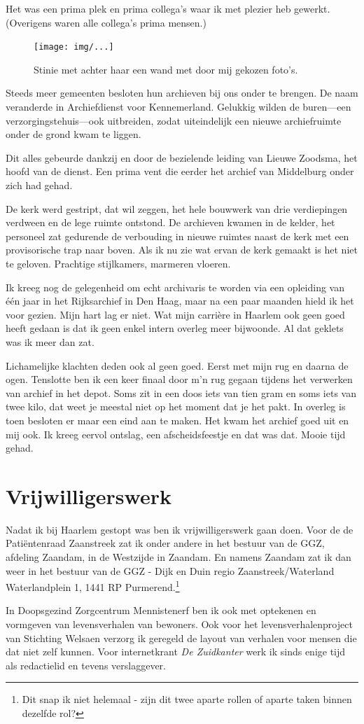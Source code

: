 \documentclass[12pt,twoside]{memoir}
\begin{document}
Het was een prima plek en prima collega’s waar ik met plezier heb gewerkt. (Overigens waren alle collega’s prima mensen.)

\begin{figure}[t]
\texttt{[image: img/...]}
\caption{Stinie met achter haar een wand met door mij gekozen foto's.}
\end{figure}

Steeds meer gemeenten besloten hun archieven bij ons onder te brengen. De naam veranderde in Archiefdienst voor Kennemerland. Gelukkig wilden de buren---een verzorgingstehuis---ook uitbreiden, zodat uiteindelijk een nieuwe archiefruimte onder de grond kwam te liggen. 

Dit alles gebeurde dankzij en door de bezielende leiding van Lieuwe Zoodsma, het hoofd van de dienst. Een prima vent die eerder het archief van Middelburg onder zich had gehad.

De kerk werd gestript, dat wil zeggen, het hele bouwwerk van drie verdiepingen verdween en de lege ruimte ontstond. De archieven kwamen in de kelder, het personeel zat gedurende de verbouding in nieuwe ruimtes naast de kerk met een provisorische trap naar boven. Als ik nu zie wat ervan de kerk gemaakt is het niet te geloven. Prachtige stijlkamers, marmeren vloeren.

Ik kreeg nog de gelegenheid om echt archivaris te worden via een opleiding van één jaar in het Rijksarchief in Den Haag, maar na een paar maanden hield ik het voor gezien. Mijn hart lag er niet. Wat mijn carrière in Haarlem ook geen goed heeft gedaan is dat ik geen enkel intern overleg meer bijwoonde. Al dat geklets was ik meer dan zat. 

Lichamelijke klachten deden ook al geen goed. Eerst met mijn rug en daarna de ogen. Tenslotte ben ik een keer finaal door m’n rug gegaan tijdens het verwerken van archief in het depot. Soms zit in een doos iets van tien gram en soms iets van twee kilo, dat weet je meestal niet op het moment dat je het pakt. In overleg is toen besloten er maar een eind aan te maken. Het kwam het archief goed uit en mij ook. Ik kreeg eervol ontslag, een afscheidsfeestje en dat was dat. Mooie tijd gehad.

\chapter{Vrijwilligerswerk} %
\label{cha:vrijwilligerswerk}

Nadat ik bij Haarlem gestopt was ben ik vrijwilligerswerk gaan doen. Voor de de Patiëntenraad Zaanstreek zat ik onder andere in het bestuur van de GGZ, afdeling Zaandam, in de Westzijde in Zaandam. En namens Zaandam zat ik dan weer in het bestuur van de GGZ - Dijk en Duin regio Zaanstreek/Waterland Waterlandplein 1, 1441 RP Purmerend.\footnote{Dit snap ik niet helemaal - zijn dit twee aparte rollen of aparte taken binnen dezelfde rol?} 

In Doopsgezind Zorgcentrum Mennistenerf ben ik ook met optekenen en vormgeven van levensverhalen van bewoners. Ook voor het levensverhalenproject van Stichting Welsaen verzorg ik geregeld de layout van verhalen voor mensen die dat niet zelf kunnen. Voor internetkrant \emph{De Zuidkanter} werk ik sinds enige tijd als redactielid en tevens verslaggever.
\end{document}
